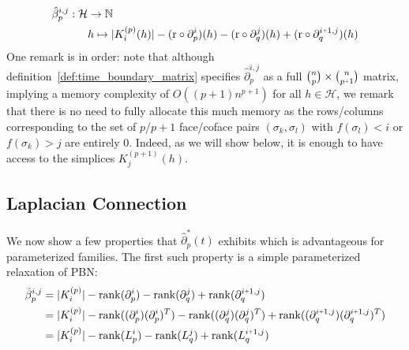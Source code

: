 \documentclass[10pt]{article}
\newcommand{\+}{%
	\raisebox{0.18ex}{\scaleobj{0.55}{+}}
}
\begin{document}
\begin{align}
	\hat{\beta}_p^{i,j} : \mathcal{H} &\to \mathbb{N} \\
	& h\mapsto \lvert K_i^{(p)}(h) \rvert  - (\mathrm{r} \circ \partial_{p}^{i})(h) - (\mathrm{r} \circ \partial_{q}^{j})(h) + (\mathrm{r} \circ \partial_{q}^{i \+ 1, j})(h)
\end{align}
One remark is in order: note that although definition~\ref{def:time_boundary_matrix} specifies $\hat{\partial}_p^{i,j}$ as a full $\binom{n}{p} \times \binom{n}{p\+1}$ matrix, implying a memory complexity of $O((p+1) n^{p+1})$ for all $h \in \mathcal{H}$, we remark that there is no need to fully allocate this much memory as the rows/columns corresponding to the set of $p$/$p+1$ face/coface pairs $(\sigma_k, \sigma_l)$ with $f(\sigma_l) < i$ or $f(\sigma_k) > j$ are entirely $0$. 
Indeed, as we will show below, it is enough to have access to the simplices $K_j^{(p+1)}(h)$. %

\subsection*{Laplacian Connection}
We now show a few properties that $\hat{\partial}_p^{\ast}(t)$ exhibits which is advantageous for parameterized families. 
The first such property is a simple parameterized relaxation of PBN:
\begin{align}
	\hat{\beta}_p^{i,j} &= \lvert K_i^{(p)} \rvert - \mathrm{rank}(\partial_{p}^{i}) - \mathrm{rank}(\partial_{q}^{j}) + \mathrm{rank}(\partial_{q}^{i \+ 1, j} ) \\
&= \lvert K_i^{(p)} \rvert - \mathrm{rank}((\partial_{p}^{i})(\partial_{p}^{i})^T) - \mathrm{rank}((\partial_{q}^{j})(\partial_{q}^{j})^T) + \mathrm{rank}( (\partial_{q}^{i \+ 1, j})(\partial_{q}^{i \+ 1, j})^T)\\
&= \lvert K_i^{(p)} \rvert - \mathrm{rank}(L_p^i) - \mathrm{rank}(L_q^j) + \mathrm{rank}(L_q^{i\+1,j})
\end{align}

\end{document}
